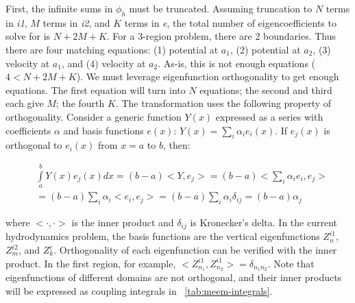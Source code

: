 \begin{appendices}
First, the infinite sums in $\phi_h$ must be truncated.
Assuming truncation to $N$ terms in \textit{i1}, $M$ terms in \textit{i2}, and $K$ terms in \textit{e}, the total number of eigencoefficients to solve for is $N+2M+K$.
For a 3-region problem, there are 2 boundaries.
Thus there are four matching equations: (1) potential at $a_1$, (2) potential at $a_2$, (3) velocity at $a_1$, and (4) velocity at $a_2$.
As-is, this is not enough equations ($4 < N+2M+K$).
We must leverage eigenfunction orthogonality to get enough equations.
The first equation will turn into $N$ equations; the second and third each give $M$; the fourth $K$.
The transformation uses the following property of orthogonality.
Consider a generic function $Y(x)$ expressed as a series with coefficients $\alpha$ and basis functions $e(x)$: $Y(x)=\sum_i \alpha_i e_i(x)$.
If $e_j(x)$ is orthogonal to $e_i(x)$ from $x = a$ to $b$, then:

\begin{equation}
\begin{aligned}
       & \int\limits_a^b Y(x)e_j(x)dx = (b-a) <Y,e_j>=(b-a)<\sum_i \alpha_i e_i, e_j> \\ &= (b-a) \sum_i \alpha_i <e_i,e_j> = (b-a) \sum_i \alpha_i \delta_{ij} = (b-a) \alpha_j
\end{aligned}
\end{equation}

where $<\cdot,\cdot>$ is the inner product and $\delta_{ij}$ is Kronecker’s delta.
In the current hydrodynamics problem, the basis functions are the vertical eigenfunctions $Z_n^{i1}$, $Z_m^{i2}$, and $Z_k^{e}$.
Orthogonality of each eigenfunction can be verified with the inner product.
In the first region, for example, $<Z_{n_1}^{i1},Z_{n_2}^{i1}>=\delta_{n_1n_2}$.
Note that eigenfunctions of different domains are not orthogonal, and their inner products will be expressed as coupling integrals in \tableautorefname~\ref{tab:meem-integrals}.


\end{appendices}
